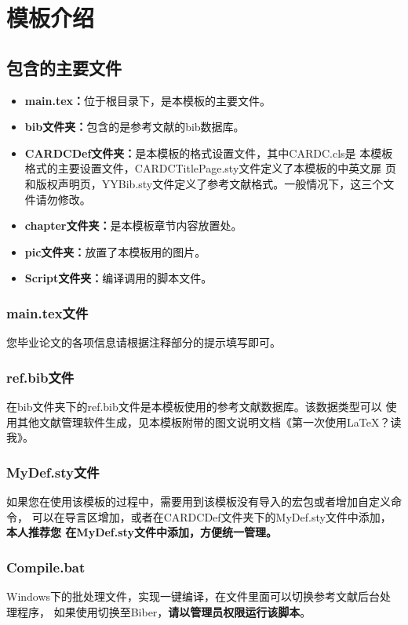 ﻿\chapter{模板介绍}
\section{包含的主要文件}
\begin{itemize}
\itemsep=0pt \parskip=0pt
\item \textbf{main.tex：}位于根目录下，是本模板的主要文件。
\item \textbf{bib文件夹：}包含的是参考文献的bib数据库。%
\item \textbf{CARDCDef文件夹：}是本模板的格式设置文件，其中CARDC.cls是
本模板格式的主要设置文件，CARDCTitlePage.sty文件定义了本模板的中英文扉
页和版权声明页，YYBib.sty文件定义了参考文献格式。一般情况下，这三个文件请勿修改。
\item \textbf{chapter文件夹：}是本模板章节内容放置处。
\item \textbf{pic文件夹：}放置了本模板用的图片。
\item \textbf{Script文件夹：}编译调用的脚本文件。
\end{itemize}

\subsection{main.tex文件}
您毕业论文的各项信息请根据注释部分的提示填写即可。

\subsection{ref.bib文件}
在bib文件夹下的ref.bib文件是本模板使用的参考文献数据库。该数据类型可以%
使用其他文献管理软件生成，见本模板附带的图文说明文档《第一次使用LaTeX？读我》。%

\subsection{MyDef.sty文件}
如果您在使用该模板的过程中，需要用到该模板没有导入的宏包或者增加自定义命令，%
可以在导言区增加，或者在CARDCDef文件夹下的MyDef.sty文件中添加，\textbf{本人推荐您%
在MyDef.sty文件中添加，方便统一管理。}

\subsection{Compile.bat}
Windows下的批处理文件，实现一键编译，在文件里面可以切换参考文献后台处理程序，%
如果使用切换至Biber，\textbf{请以管理员权限运行该脚本}。

